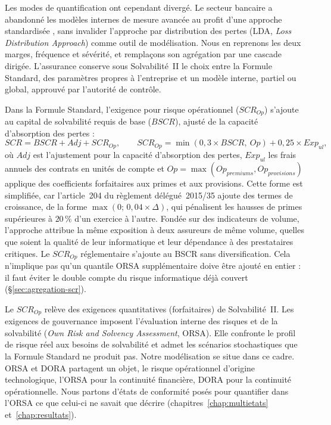 Les modes de quantification ont cependant divergé. Le secteur bancaire a abandonné les
modèles internes de mesure avancée au profit d'une approche standardisée \citep{bcbs2017}, sans invalider l'approche
par distribution des pertes (LDA, \emph{Loss Distribution Approach}) comme outil de modélisation.
Nous en reprenons les deux marges, fréquence et sévérité, et remplaçons son agrégation par une
cascade dirigée. L'assurance conserve sous Solvabilité~II le choix entre la Formule Standard, des
paramètres propres à l'entreprise et un modèle interne, partiel ou global, approuvé par l'autorité de
contrôle.

Dans la Formule Standard, l'exigence pour risque opérationnel ($SCR_{Op}$) s'ajoute au capital de
solvabilité requis de base ($BSCR$), ajusté de la capacité d'absorption des pertes :
\begin{equation}
SCR = BSCR + Adj + SCR_{Op},
\qquad
SCR_{Op} = \min(0{,}3 \times BSCR,\ Op) + 0{,}25 \times Exp_{ul},
\label{reg:eq:scrop}
\end{equation}
où $Adj$ est l'ajustement pour la capacité d'absorption des pertes, $Exp_{ul}$ les frais annuels des contrats en unités de compte et $Op = \max(Op_{premiums}, Op_{provisions})$ applique des coefficients forfaitaires aux primes et
aux provisions. Cette forme est simplifiée, car l'article~204 du règlement délégué~2015/35 ajoute des
termes de croissance, de la forme $\max\!\left(0;\, 0{,}04 \times \Delta\!\right)$, qui pénalisent
les hausses de primes supérieures à $20\,\%$ d'un exercice à l'autre. Fondée sur des indicateurs de
volume, l'approche attribue la même exposition à deux assureurs de même volume, quelles que soient la
qualité de leur informatique et leur dépendance à des prestataires critiques. Le $SCR_{Op}$ réglementaire s'ajoute au BSCR sans diversification. Cela n'implique pas qu'un quantile ORSA supplémentaire doive être ajouté en entier : il faut éviter le double compte du risque informatique déjà couvert (\S\ref{sec:agregation-scr}).

Le $SCR_{Op}$ relève des exigences quantitatives (forfaitaires) de Solvabilité~II. Les exigences de gouvernance imposent l'évaluation
interne des risques et de la solvabilité (\emph{Own Risk and Solvency Assessment}, ORSA). Elle
confronte le profil de risque réel aux besoins de solvabilité et admet les scénarios stochastiques
que la Formule Standard ne produit pas. Notre modélisation se situe dans ce cadre. ORSA et DORA
partagent un objet, le risque opérationnel d'origine technologique, l'ORSA pour la continuité
financière, DORA pour la continuité opérationnelle. Nous partons d'états de conformité posés pour quantifier dans l'ORSA ce que celui-ci ne savait que décrire (chapitres~\ref{chap:multietats}
et~\ref{chap:resultats}).
